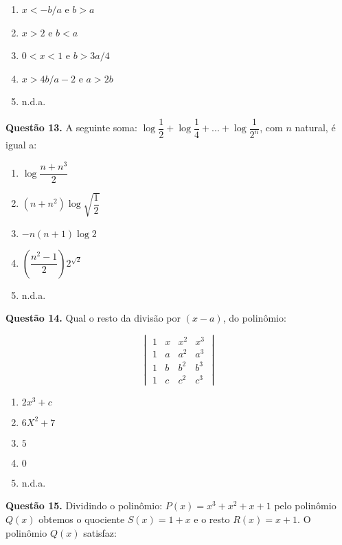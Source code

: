 \documentclass[11pt]{article}
\begin{document}
\begin{multicols}{3}
    \begin{enumerate}[\bf A (\quad)]
        \item $x < -b/a$ e $b > a$
        \item $x > 2$ e $b < a$
        \item $0 < x < 1$ e $b > 3a/4$
        \item $x > 4b/a-2$ e $a > 2b$
        \item n.d.a.
    \end{enumerate}
\end{multicols}


\textbf{Questão 13.} A seguinte soma: $\log \dfrac{1}{2} + \log \dfrac{1}{4} + ... + \log \dfrac{1}{2^n}$, com $n$ natural, é igual a:

\begin{enumerate}[\bf A (\quad)]
    \item $\log \dfrac{n + n^3}{2}$
    \item $(n + n^2) \log \sqrt{\dfrac{1}{2}}$
    \item $-n(n+1) \log 2$
    \item $\left( \dfrac{n^2 - 1}{2} \right) 2^{\sqrt{2}}$
    \item n.d.a.
\end{enumerate}


\textbf{Questão 14.} Qual o resto da divisão por $(x - a)$, do polinômio:

\[
\begin{vmatrix}
1 & x & x^2 & x^3\\
1 & a & a^2 & a^3\\
1 & b & b^2 & b^3\\
1 & c & c^2 & c^3
\end{vmatrix}
\]

\begin{multicols}{3}
    \begin{enumerate}[\bf A (\quad)]
        \item $2x^3 + c$
        \item $6X^2 + 7$
        \item $5$
        \item $0$
        \item n.d.a.
    \end{enumerate}
\end{multicols}

\textbf{Questão 15.} Dividindo o polinômio: $P(x) = x^3 + x^2 + x + 1$ pelo polinômio $Q(x)$ obtemos o quociente $S(x) = 1 + x$ e o resto $R(x) = x + 1$. O polinômio $Q(x)$ satisfaz:
\end{document}
